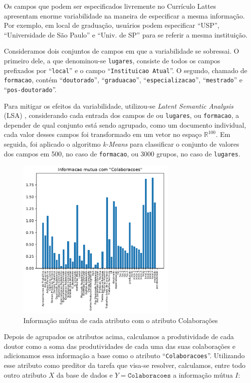 \documentclass[12pt]{article}
\begin{document}
Os campos que podem ser especificados livremente no Currículo Lattes apresentam enorme variabilidade na maneira de especificar a mesma informação.
Por exemplo, em local de graduação, usuários podem especificar ``USP'', ``Universidade de São Paulo'' e ``Univ. de SP'' para se referir a mesma instituição.

Consideramos dois conjuntos de campos em que a variabilidade se sobressai.
O primeiro dele, a que denominou-se \texttt{lugares}, consiste de todos os campos prefixados por ``\texttt{local}'' e o campo ``\texttt{Instituicao Atual}''.
O segundo, chamado de \texttt{formacao}, contém ``\texttt{doutorado}'', ``\texttt{graduacao}'', ``\texttt{especializacao}'', ``\texttt{mestrado}'' e ``\texttt{pos-doutorado}''.

Para mitigar os efeitos da variabilidade, utilizou-se \emph{Latent Semantic Analysis} (LSA) \cite{lsa}, considerando cada entrada dos campos de ou \texttt{lugares}, ou \texttt{formacao}, a depender de qual conjunto está sendo agrupado, como um documento individual, cada valor desses campos foi transformado em um vetor no espaço $\mathbb{R}^{100}$.
Em seguida, foi aplicado o algoritmo \emph{k-Means} para classificar o conjunto de valores dos campos em 500, no caso de \texttt{formacao}, ou 3000 grupos, no caso de \texttt{lugares}.

\begin{figure}
  \centering
  \includegraphics[width=0.7\textwidth]{graphs/mutual_information.pdf}
  \caption{Informação mútua de cada atributo com o atributo Colaborações}
  \label{fig:mutual-info}
\end{figure}

Depois de agrupados os atributos acima, calculamos a produtividade de cada doutor como a soma das produtividades de cada uma das suas colaborações e adicionamos essa informação a base como o atributo ``\texttt{Colaboracoes}''.
Utilizando esse atributo como preditor da tarefa que visa-se resolver, calculamos, entre todo outro atributo $X$ da base de dados e $Y = \texttt{Colaboracoes}$ a informação mútua $I$:
\end{document}
